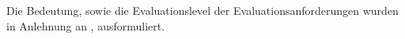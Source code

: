 \addtocounter{anhang}{1}
 \label{anhangb}
Die Bedeutung, sowie die Evaluationslevel der Evaluationsanforderungen wurden in Anlehnung an \cite[S. 56-64]{34}, \cite{36, 35} ausformuliert.
\clearpage
{}
\recalctypearea



\clearpage
{}
\pagestyle{scrheadings}
\recalctypearea

%
%
%
%
%

%

